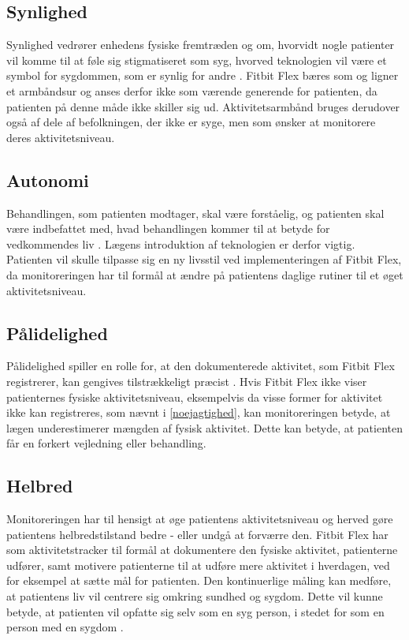 \subsection{Synlighed}

Synlighed vedrører enhedens fysiske fremtræden og om, hvorvidt nogle patienter vil komme til at føle sig stigmatiseret som syg, hvorved teknologien vil være et symbol for sygdommen, som er synlig for andre \citep{Mittelstand2011}. Fitbit Flex bæres som og ligner et armbåndsur og anses derfor ikke som værende generende for patienten, da patienten på denne måde ikke skiller sig ud. Aktivitetsarmbånd bruges derudover også af dele af befolkningen, der ikke er syge, men som ønsker at monitorere deres aktivitetsniveau. 

\subsection{Autonomi}

Behandlingen, som patienten modtager, skal være forståelig, og patienten skal være indbefattet med, hvad behandlingen kommer til at betyde for vedkommendes liv \citep{Mittelstand2011}. Lægens introduktion af teknologien er derfor vigtig. Patienten vil skulle tilpasse sig en ny livsstil ved implementeringen af Fitbit Flex, da monitoreringen har til formål at ændre på patientens daglige rutiner til et øget aktivitetsniveau.  %

\subsection{Pålidelighed}

Pålidelighed spiller en rolle for, at den dokumenterede aktivitet, som Fitbit Flex registrerer, kan gengives tilstrækkeligt præcist \citep{Nordgren2013}.
Hvis Fitbit Flex ikke viser patienternes fysiske aktivitetsniveau, eksempelvis da visse former for aktivitet ikke kan registreres, som nævnt i \autoref{noejagtighed}, kan monitoreringen betyde, at lægen underestimerer mængden af fysisk aktivitet. Dette kan betyde, at patienten får en forkert vejledning eller behandling. 
 
\subsection{Helbred}

Monitoreringen har til hensigt at øge patientens aktivitetsniveau og herved gøre patientens helbredstilstand bedre - eller undgå at forværre den. Fitbit Flex har som aktivitetstracker til formål at dokumentere den fysiske aktivitet, patienterne udfører, samt motivere patienterne til at udføre mere aktivitet i hverdagen, ved for eksempel at sætte mål for patienten. Den kontinuerlige måling kan medføre, at patientens liv vil centrere sig omkring sundhed og sygdom. Dette vil kunne betyde, at patienten vil opfatte sig selv som en syg person, i stedet for som en person med en sygdom \citep{Nordgren2013}.

